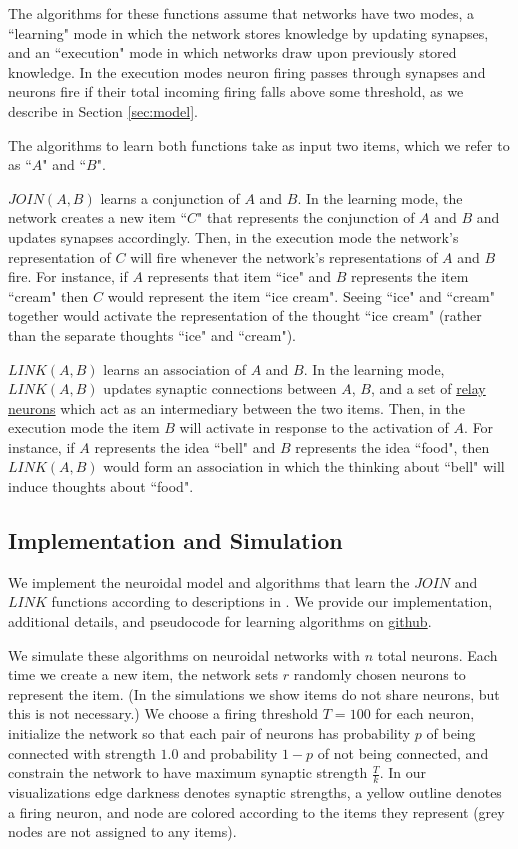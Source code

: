 \documentclass[letterpaper, 12pt]{article}
\begin{document}
The algorithms for these functions assume that networks have two modes, a ``learning" mode in which the network stores knowledge by updating synapses, and an ``execution" mode in which networks draw upon previously stored knowledge. In the execution modes neuron firing passes through synapses and neurons fire if their total incoming firing falls above some threshold, as we describe in Section \ref{sec:model}.

The algorithms to learn both functions take as input two items, which we refer to as ``$A$" and ``$B$".

$JOIN(A,B)$ learns a conjunction of $A$ and $B$. In the learning mode, the network creates a new item ``$C$" that represents the conjunction of $A$ and $B$ and updates synapses accordingly. Then, in the execution mode the network's representation of $C$ will fire whenever the network's representations of $A$ and $B$ fire. For instance, if $A$ represents that item ``ice" and $B$ represents the item ``cream" then $C$ would represent the item ``ice cream". Seeing ``ice" and ``cream" together would activate the representation of the thought ``ice cream" (rather than the separate thoughts ``ice" and ``cream").

$LINK(A,B)$ learns an association of $A$ and $B$. In the learning mode, $LINK(A,B)$ updates synaptic connections between $A$, $B$, and a set of \underline{relay neurons} which act as an intermediary between the two items. Then, in the execution mode the item $B$ will activate in response to the activation of $A$. For instance, if $A$ represents the idea ``bell" and $B$ represents the idea ``food", then $LINK(A,B)$ would form an association in which the thinking about ``bell" will induce thoughts about ``food".

\subsection{Implementation and Simulation}
We implement the neuroidal model and algorithms that learn the $JOIN$ and $LINK$ functions according to descriptions in \cite{valiant_memorization_2005}. We provide our implementation, additional details, and pseudocode for learning algorithms on \href{https://github.com/cchen23/neuroidal_model_project/tree/master/Code}{github}.

We simulate these algorithms on neuroidal networks with $n$ total neurons. Each time we create a new item, the network sets $r$ randomly chosen neurons to represent the item. (In the simulations we show items do not share neurons, but this is not necessary.) We choose a firing threshold $T=100$ for each neuron, initialize the network so that each pair of neurons has probability $p$ of being connected with strength $1.0$ and probability $1-p$ of not being connected, and constrain the network to have maximum synaptic strength $\frac{T}{k}$. In our visualizations edge darkness denotes synaptic strengths, a yellow outline denotes a firing neuron, and node are colored according to the items they represent (grey nodes are not assigned to any items).
\end{document}
